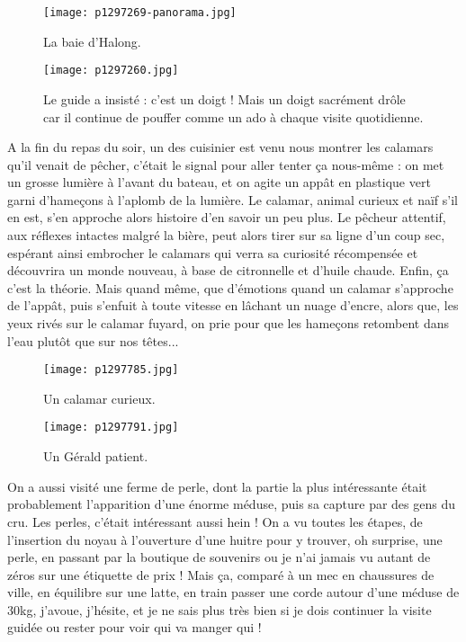 \documentclass{book}
\begin{document}
\begin{figure}[h]
\centering
\texttt{[image: p1297269-panorama.jpg]}
\caption*{La baie d'Halong.}
\end{figure}




\begin{figure}[h]
\centering
\texttt{[image: p1297260.jpg]}
\caption*{Le guide a insisté : c'est un doigt ! Mais un doigt sacrément drôle car il continue de pouffer comme un ado à chaque visite quotidienne.}
\end{figure}

A la fin du repas du soir, un des cuisinier est venu nous montrer les calamars qu'il venait de pêcher, c'était le signal pour aller tenter ça nous-même : on met un grosse lumière à l'avant du bateau, et on agite un appât en plastique vert garni d'hameçons à l'aplomb de la lumière. Le calamar, animal curieux et naïf s'il en est, s'en approche alors  histoire d'en savoir un peu plus. Le pêcheur attentif, aux réflexes intactes malgré la bière, peut alors tirer sur sa ligne d'un coup sec, espérant ainsi embrocher le calamars qui verra sa curiosité récompensée et découvrira un monde nouveau, à base de citronnelle et d'huile chaude. Enfin, ça c'est la théorie. Mais quand même, que d'émotions quand un calamar s'approche de l'appât, puis s’enfuit à toute vitesse  en lâchant un nuage d'encre, alors que, les yeux rivés sur le calamar fuyard, on prie pour que les hameçons retombent dans l'eau plutôt que sur nos têtes...


\begin{figure}[h]
\centering
\texttt{[image: p1297785.jpg]}
\caption*{Un calamar curieux.}
\end{figure}


\begin{figure}[h]
\centering
\texttt{[image: p1297791.jpg]}
\caption*{Un Gérald patient.}
\end{figure}

On a aussi visité une ferme de perle, dont la partie la plus intéressante était probablement l'apparition d'une énorme méduse, puis sa capture par des gens du cru. Les perles, c'était intéressant aussi hein ! On a vu toutes les étapes, de l'insertion du noyau à l'ouverture d'une huitre pour y trouver, oh surprise, une perle, en passant par la boutique de souvenirs ou je n'ai jamais vu autant de zéros sur une étiquette de prix ! Mais ça, comparé à un mec en chaussures de ville, en équilibre sur une latte, en train passer une corde autour d'une méduse de 30kg, j'avoue, j'hésite, et je ne sais plus très bien si je dois continuer la visite guidée ou rester pour voir qui va manger qui !
\end{document}

